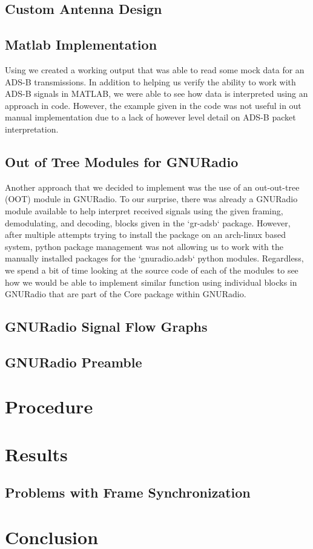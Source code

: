 \documentclass[conference]{IEEEtran}
\begin{document}
\subsection{Custom Antenna Design}

\subsection{Matlab Implementation}
 Using \cite{matlabAir} we created a working output that was able to read some mock data for an ADS-B transmissions.
In addition to helping us verify the ability to work with ADS-B signals in MATLAB, we were able to see how data is interpreted using an approach in code. 
However, the example given in the code was not useful in out manual implementation due to a lack of however level detail on ADS-B packet interpretation.

\subsection{Out of Tree Modules for GNURadio}
Another approach that we decided to implement was the use of an out-out-tree (OOT) module \cite{oot-adsb} in GNURadio.
To our surprise, there was already a GNURadio module available to help interpret received signals using the given framing, demodulating, and decoding, blocks given in the `gr-adsb` package.
However, after multiple attempts trying to install the package on an arch-linux based system, python package management was not allowing us to work with the manually installed packages for the `gnuradio.adsb` python modules.
Regardless, we spend a bit of time looking at the source code of each of the modules to see how we would be able to implement similar function using individual blocks in GNURadio that are part of the Core package within GNURadio.


\subsection{GNURadio Signal Flow Graphs}

\subsection{GNURadio Preamble}

\section{Procedure}

\section{Results}

\subsection{Problems with Frame Synchronization}

\section{Conclusion}







\end{document}
